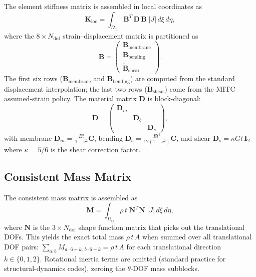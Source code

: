 The element stiffness matrix is assembled in local coordinates as
\begin{equation}
  \mathbf{K}_{\mathrm{loc}}
  = \int_{\Omega_{\Box}} \mathbf{B}^T \, \mathbf{D} \, \mathbf{B}
    \; \lvert J \rvert \, d\xi\, d\eta
  ,
  \label{eq:K-local}
\end{equation}
where the $8 \times N_\mathrm{dof}$ strain--displacement matrix is
partitioned as
\[
  \mathbf{B} =
  \begin{pmatrix}
    \mathbf{B}_{\mathrm{membrane}} \\
    \mathbf{B}_{\mathrm{bending}}  \\
    \tilde{\mathbf{B}}_{\mathrm{shear}}
  \end{pmatrix}
  .
\]
The first six rows ($\mathbf{B}_\mathrm{membrane}$ and
$\mathbf{B}_\mathrm{bending}$) are computed from the standard
displacement interpolation; the last two rows
($\tilde{\mathbf{B}}_\mathrm{shear}$) come from the MITC
assumed-strain policy.  The material matrix $\mathbf{D}$ is
block-diagonal:
\[
  \mathbf{D} =
  \begin{pmatrix}
    \mathbf{D}_m  &                & \\
                  & \mathbf{D}_b   & \\
                  &                & \mathbf{D}_s
  \end{pmatrix}
  ,
\]
with membrane $\mathbf{D}_m = \frac{Et}{1-\nu^2}\mathbf{C}$,
bending $\mathbf{D}_b = \frac{Et^3}{12(1-\nu^2)}\mathbf{C}$, and
shear $\mathbf{D}_s = \kappa G t \, \mathbf{I}_2$ where
$\kappa = 5/6$ is the shear correction factor.

\subsection{Consistent Mass Matrix}
\label{sec:mitc-mass}

The consistent mass matrix is assembled as
\begin{equation}
  \mathbf{M} = \int_{\Omega_{\Box}}
    \rho \, t \;
    \mathbf{N}^T \mathbf{N}
    \; \lvert J \rvert \, d\xi\, d\eta
  ,
  \label{eq:M-consistent}
\end{equation}
where $\mathbf{N}$ is the $3 \times N_\mathrm{dof}$ shape function
matrix that picks out the translational DOFs.  This yields the
exact total mass $\rho \, t \, A$ when summed over all translational
DOF pairs:
$\sum_{a,b} M_{a\cdot6+k,\, b\cdot6+k} = \rho \, t \, A$
for each translational direction $k \in \{0,1,2\}$.
Rotational inertia terms are omitted (standard practice for
structural-dynamics codes), zeroing the $\theta$-DOF mass
subblocks.

